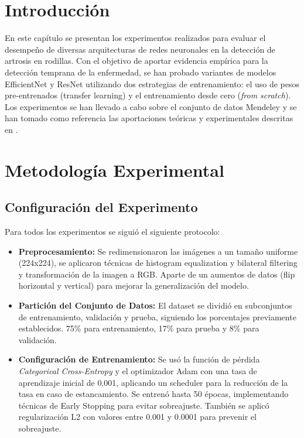 \documentclass[11pt,spanish,listoffigures,listoftables]{tfgetsinf}
\begin{document}
\section{Introducción}
En este capítulo se presentan los experimentos realizados para evaluar el desempeño de diversas arquitecturas de redes neuronales en la detección de artrosis en rodillas. Con el objetivo de aportar evidencia empírica para la detección temprana de la enfermedad, se han probado variantes de modelos EfficientNet y ResNet utilizando dos estrategias de entrenamiento: el uso de pesos pre-entrenados (transfer learning) y el entrenamiento desde cero (\textit{from scratch}). Los experimentos se han llevado a cabo sobre el conjunto de datos Mendeley \cite{chen2018knee} y se han tomado como referencia las aportaciones teóricas y experimentales descritas en \cite{efficientnet_paper}. 

\section{Metodología Experimental}

\subsection{Configuración del Experimento}
Para todos los experimentos se siguió el siguiente protocolo:
\begin{itemize}
    \item \textbf{Preprocesamiento:} Se redimensionaron las imágenes a un tamaño uniforme (224x224), se aplicaron técnicas de histogram equalization y bilateral filtering y transformación de la imagen a RGB. Aparte de un aumentos de datos (flip horizontal y vertical) para mejorar la generalización del modelo.
    \item \textbf{Partición del Conjunto de Datos:} El dataset se dividió en subconjuntos de entrenamiento, validación y prueba, siguiendo los porcentajes previamente establecidos. 75\% para entrenamiento, 17\% para prueba y 8\% para validación.
    \item \textbf{Configuración de Entrenamiento:} Se usó la función de pérdida \textit{Categorical Cross-Entropy} y el optimizador Adam con una tasa de aprendizaje inicial de 0.001, aplicando un scheduler para la reducción de la tasa en caso de estancamiento. Se entrenó hasta 50 épocas, implementando técnicas de Early Stopping para evitar sobreajuste. También se aplicó regularización L2 con valores entre 0.001 y 0.0001 para prevenir el sobreajuste.
\end{itemize}
\end{document}
